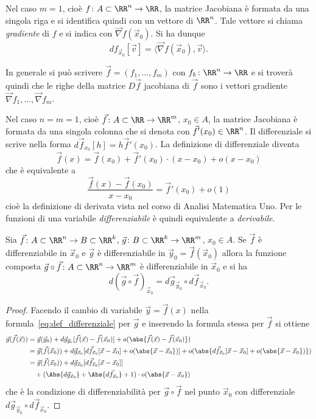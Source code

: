 Nel caso $m=1$, cioè $f\colon A\subset \RR^n\to \RR$, la matrice Jacobiana
è formata da una singola riga e si identifica quindi con un 
vettore di $\RR^n$. 
Tale vettore si chiama \emph{gradiente} di $f$ e si indica con 
$\vec\nabla f(\vec x_0)$. 
Si ha dunque
\[
  d f_{\vec x_0}[\vec v] = \langle \vec\nabla f(\vec x_0), \vec v\rangle.
\]

In generale si può scrivere $\vec f = (f_1,\dots,f_m)$ con $f_k\colon \RR^n \to \RR$
e si troverà quindi che le righe della matrice $D\vec f$ jacobiana di $\vec f$
sono i vettori gradiente $\vec\nabla f_1, \dots, \vec\nabla f_m$.

Nel caso $n=m=1$, cioè $\vec f\colon A\subset \RR\to\RR^m$, $x_0\in A$,
la matrice Jacobiana è formata da una singola colonna che si denota con
$\vec f'(x_0) \in \RR^n$.
Il differenziale si scrive nella forma $d\vec f_{x_0}[h] = h \vec f'(x_0)$.
La definizione di differenziale diventa
\[
 \vec f(x) = \vec f(x_0) + \vec f'(x_0)\cdot (x-x_0) + o(x-x_0)
\] 
che è equivalente a 
\[
  \frac{\vec f(x) - \vec f(x_0)}{x-x_0} = \vec f'(x_0) + o(1)
\]
cioè la definizione di derivata vista nel corso di Analisi Matematica Uno.
Per le funzioni di una variabile \emph{differenziabile} è quindi equivalente 
a \emph{derivabile}. 

\begin{theorem}
  Sia $\vec f\colon A \subset \RR^n \to B\subset \RR^k$,
  $\vec g\colon B\subset \RR^k \to \RR^m$, $x_0\in A$.
  Se $\vec f$ è differenziabile in $\vec x_0$ 
  e $\vec g$ è differenziabile in $\vec y_0 = \vec f(\vec x_0)$ 
  allora la funzione composta $\vec g\circ \vec f\colon A \subset \RR^n \to \RR^m$
  è differenziabile in $\vec x_0$ e si ha 
  \[
    d (\vec g \circ \vec f)_{\vec x_0} 
    = d\vec g_{\vec y_0}\circ d\vec f_{\vec x_0}.
  \]
\end{theorem}
%
\begin{proof}
  Facendo il cambio di variabile $\vec y = \vec f(x)$ nella formula~\eqref{eq:def_differenziale}
  per $\vec g$
  e inserendo la formula stessa per $\vec f$
  si ottiene
  \begin{align*}
    \vec g(\vec f(\vec x)) 
    & = \vec g(\vec y_0) 
        + d\vec g_{\vec y_0}[\vec f(\vec x)-\vec f(\vec x_0)]
        + o(\abs{\vec f(\vec x)- \vec f(\vec x_0)})\\
    & = \vec g(\vec f(\vec x_0)) 
        + d\vec g_{\vec x_0}[d\vec f_{\vec x_0}[\vec x - \vec x_0] 
          + o(\abs{\vec x - \vec x_0})]
        + o(\abs{d\vec f_{\vec x_0}[\vec x - \vec x_0] 
          + o(\abs{\vec x - \vec x_0})})\\
    & = \vec g(\vec f(\vec x_0))
       + d\vec g_{\vec x_0}[d\vec f_{\vec x_0}[\vec x - \vec x_0]]\\
    & \quad + (\Abs{d \vec g_{\vec x_0}}+\Abs{d \vec f_{\vec x_0}} + 1)\cdot o(\abs{\vec x - \vec x_0})
  \end{align*}
  che è la condizione di differenziabilità per $\vec g \circ \vec f$ 
  nel punto $\vec x_0$ con differenziale $d \vec g_{\vec y_0}\circ d \vec f_{\vec x_0}$.
\end{proof}

